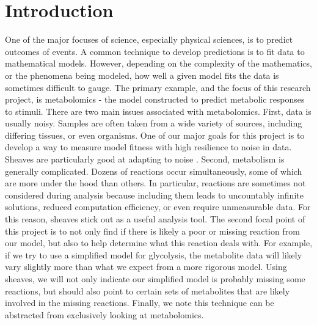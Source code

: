 \documentclass[10.5pt]{article}
\begin{document}
\maketitle

\section{Introduction}

One of the major focuses of science, especially physical sciences, is to 
predict outcomes of events. A common technique to develop predictions is to fit 
data to mathematical models. However, depending on the complexity of the 
mathematics, or the 
phenomena being modeled, how well a given model fits the data is sometimes 
difficult to gauge. The 
primary example, and the focus of this research project, is metabolomics - the 
model constructed to predict metabolic responses to stimuli. There are two main 
issues associated with metabolomics. First, data is usually noisy. Samples are 
often taken from a wide variety of sources, including differing tissues, or 
even organisms. One of our major goals for this project is to develop a way to 
measure model fitness with high resilience to noise in data. Sheaves are 
particularly good at adapting to noise \cite{robinson2017sheaves}. Second, 
metabolism is generally complicated. Dozens of reactions occur simultaneously, 
some of which are more under the hood than others. In particular, reactions are 
sometimes not considered during analysis because including them leads to 
uncountably infinite solutions, reduced computation efficiency, or even require 
unmeasurable data. For this reason, sheaves stick out as a useful analysis 
tool. The second focal point of this project 
is to not only find if there is likely a poor or missing reaction from our 
model, but also to help determine what this reaction deals with. For example, 
if we try to use a simplified model for glycolysis, the metabolite data will 
likely vary slightly more than what we expect from a more rigorous model. Using 
sheaves, we will not only indicate our simplified model is probably missing 
some reactions, but should also point to certain sets of metabolites that are 
likely involved in the missing reactions. Finally, we note this technique can 
be abstracted from exclusively looking at metabolomics. 
\end{document}
